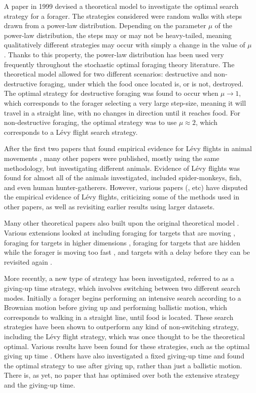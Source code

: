 A paper in 1999 \cite{Viswanathan_1999} devised a theoretical model to investigate the optimal search strategy for a forager. The strategies considered were random walks with steps drawn from a power-law distribution. Depending on the parameter $\mu$ of the power-law distribution, the steps may or may not be heavy-tailed, meaning qualitatively different strategies may occur with simply a change in the value of $\mu$. Thanks to this property, the power-law distribution has been used very frequently throughout the stochastic optimal foraging theory literature. The theoretical model allowed for two different scenarios: destructive and non-destructive foraging, under which the food once located is, or is not, destroyed. The optimal strategy for destructive foraging was found to occur when $\mu \to 1$, which corresponds to the forager selecting a very large step-size, meaning it will travel in a straight line, with no changes in direction until it reaches food. For non-destructive foraging, the optimal strategy was to use $\mu \approx 2$, which corresponds to a L\'{e}vy flight search strategy.

After the first two papers that found empirical evidence for L\'{e}vy flights in animal movements \cite{Cole_1995,Viswanathan_1996}, many other papers were published, mostly using the same methodology, but investigating different animals. Evidence of L\'{e}vy flights was found for almost all of the animals investigated, included spider-monkeys, fish, and even human hunter-gatherers. However, various papers (\cite{Benhamou_1989,Edwards_2011}, etc) have disputed the empirical evidence of L\'{e}vy flights, criticizing some of the methods used in other papers, as well as revisiting earlier results using larger datasets.


Many other theoretical papers also built upon the original theoretical model \cite{Viswanathan_1999}. Various extensions looked at including foraging for targets that are moving \cite{Bartumeus_2002}, foraging for targets in higher dimensions \cite{Santos_2005}, foraging for targets that are hidden while the forager is moving too fast \cite{Benichou_2005}, and targets with a delay before they can be revisited again \cite{Raposo_2003}.

More recently, a new type of strategy has been investigated, referred to as a giving-up time strategy, which involves switching between two different search modes. Initially a forager begins performing an intensive search according to a Brownian motion before giving up and performing ballistic motion, which corresponds to walking in a straight line, until food is located. These search strategies have been shown to outperform any kind of non-switching strategy, including the L\'{e}vy flight strategy, which was once thought to be the theoretical optimal. Various results have been found for these strategies, such as the optimal giving up time \cite{Plank_2008}. Others have also investigated a fixed giving-up time and found the optimal strategy to use after giving up, rather than just a ballistic motion. There is, as yet, no paper that has optimised over both the extensive strategy and the giving-up time.



